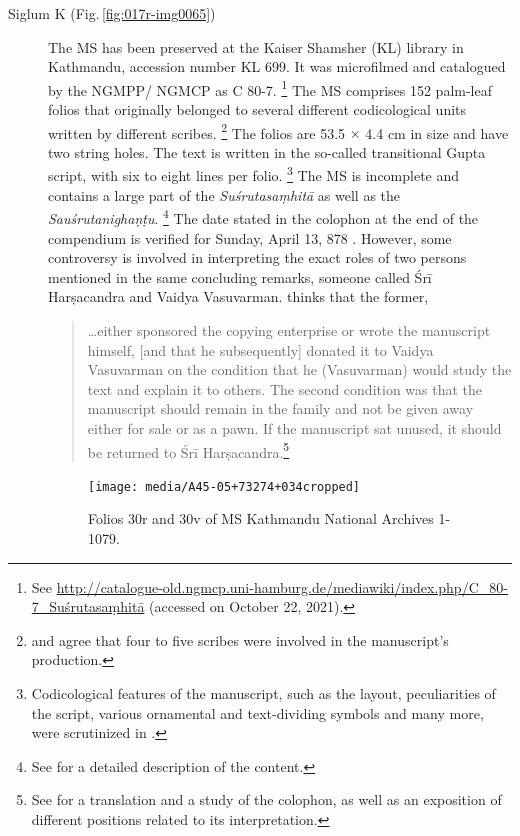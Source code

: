 \begin{description}
       
\item[Siglum K (Fig.\,\ref{fig:017r-img0065})] The MS has been preserved at the Kaiser 
Shamsher (KL) library in Kathmandu, accession number KL 699. It was microfilmed and 
catalogued by the NGMPP/ NGMCP as C 80-7.%
    \footnote{%
    See 
    \url{http://catalogue-old.ngmcp.uni-hamburg.de/mediawiki/index.php/C_80-7_Suśrutasaṃhitā}
     (accessed on October 22, 2021).%
    } 
The MS comprises 152 palm-leaf folios that originally belonged to several different codicological units written by different scribes.%
    \footnote{%
    \textcites[46]{bhat-2020} and \textcites[11]{kleb-2021b} agree that four to five scribes were involved in the manuscript's production.
    } 
The folios are 53.5 $\times$ 4.4 cm in size and have two string holes.  The text is written in the so-called transitional Gupta script, with six to eight lines per folio.%
    \footnote{%
    Codicological features of the manuscript, such as the layout, peculiarities of the script, various ornamental and text-dividing symbols and many more, were scrutinized in \textcites{bhat-2020}.
    }
The MS is incomplete and contains a large part of the \emph{Suśrutasaṃhitā} as well as the \emph{Sauśrutanighaṇṭu}.%
    \footnote{%
    See \textcites[11]{kleb-2021b} for a detailed description of the content.%
    }
The date stated in the colophon at the end of the compendium is verified for Sunday, April 13, 
878 \CE. However, some controversy is involved in interpreting the exact roles of two 
persons 
mentioned in the same concluding remarks, someone called Śrī Harṣacandra and Vaidya 
Vasuvarman. \textcites[16]{kleb-2021b} thinks that the former,
\begin{quote}
\ldots either sponsored the copying enterprise or wrote the manuscript himself,
[and that he subsequently]
    donated it to Vaidya Vasuvarman on the condition that he (Vasuvarman)
would study the text and explain it to others. The second condition was that
the manuscript should remain in the family and not be given away either for
sale or as a pawn. If the manuscript sat unused, it should be returned to Śrī
Harṣacandra.\footnote{See \textcites[13--17]{kleb-2021b} for a translation and
    a study of the colophon, as well as an exposition of different positions
    related to its interpretation.}
\end{quote}



\begin{figure}[t]
    \centering
    \texttt{[image: media/A45-05+73274+034cropped]}
    \caption{Folios 30r and 30v of MS Kathmandu National Archives 1-1079.}
    \label{fig:a45-0573274044}
\end{figure}


\end{description}
